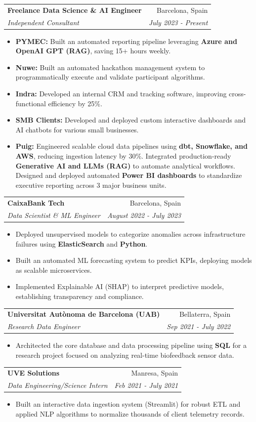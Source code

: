 \documentclass[letterpaper,11pt]{article}
\makeatletter
\newcommand{\resumeSubheading}[4]{
  \vspace{-0.5pt}\item
    \begin{tabular*}{0.97\textwidth}[t]{l@{\extracolsep{\fill}}r}
      \textbf{#1} & #2 \\
      \textit{\small#3} & \textit{\small #4} \\
    \end{tabular*}\vspace{-1.5pt}
}
\newcommand{\resumeItemListStart}{\begin{itemize}}
\newcommand{\resumeItemListEnd}{\end{itemize}\vspace{-2pt}}
\makeatother
\begin{document}
{    \resumeSubheading
        {Freelance Data Science \& AI Engineer}{Barcelona, Spain}
        {Independent Consultant}{July 2023 - Present}
        \resumeItemListStart
        \item{\textbf{PYMEC:} Built an automated reporting pipeline leveraging \textbf{Azure and OpenAI GPT (RAG)}, saving 15+ hours weekly.}
        \item{\textbf{Nuwe:} Built an automated hackathon management system to programmatically execute and validate participant algorithms.}
        \item{\textbf{Indra:} Developed an internal CRM and tracking software, improving cross-functional efficiency by 25\%.}
        \item{\textbf{SMB Clients:} Developed and deployed custom interactive dashboards and AI chatbots for various small businesses.}
        \item{\textbf{Puig:} Engineered scalable cloud data pipelines using \textbf{dbt, Snowflake, and AWS}, reducing ingestion latency by 30\%. Integrated production-ready \textbf{Generative AI and LLMs (RAG)} to automate analytical workflows. Designed and deployed automated \textbf{Power BI dashboards} to standardize executive reporting across 3 major business units.}
        \resumeItemListEnd

    \resumeSubheading
          {CaixaBank Tech}{Barcelona, Spain}
          {Data Scientist \& ML Engineer}{August 2022 - July 2023}
          \resumeItemListStart
          \item{Deployed unsupervised models to categorize anomalies across infrastructure failures using \textbf{ElasticSearch} and \textbf{Python}.}
          \item{Built an automated ML forecasting system to predict KPIs, deploying models as scalable microservices.}
          \item{Implemented Explainable AI (SHAP) to interpret predictive models, establishing transparency and compliance.}
          \resumeItemListEnd

    \resumeSubheading
      {Universitat Autònoma de Barcelona (UAB)}{Bellaterra, Spain}
      {Research Data Engineer}{Sep 2021 - July 2022}
      \resumeItemListStart
      \item{Architected the core database and data processing pipeline using \textbf{SQL} for a research project focused on analyzing real-time biofeedback sensor data.}
      \resumeItemListEnd
          
    \resumeSubheading
      {UVE Solutions}{Manresa, Spain}
      {Data Engineering/Science Intern}{Feb 2021 - July 2021}
      \resumeItemListStart
      \item{Built an interactive data ingestion system (Streamlit) for robust ETL and applied NLP algorithms to normalize thousands of client telemetry records.}
      \resumeItemListEnd

}
\end{document}
